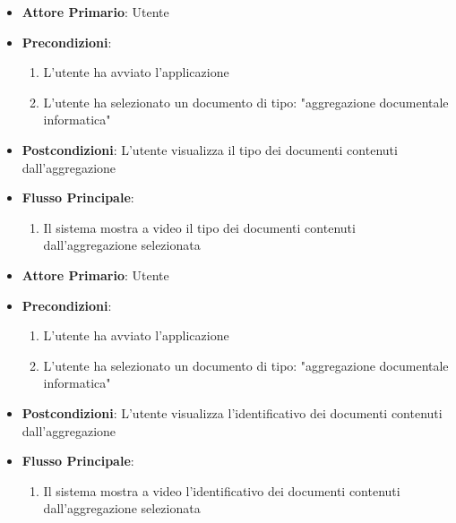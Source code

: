 \begin{itemize}
    \item \textbf{Attore Primario}: Utente
    \item \textbf{Precondizioni}:
    \begin{enumerate}
        \item L'utente ha avviato l'applicazione
        \item L'utente ha selezionato un documento di tipo: "aggregazione documentale informatica"
    \end{enumerate}
    \item \textbf{Postcondizioni}: L'utente visualizza il tipo dei documenti contenuti dall'aggregazione
    \item \textbf{Flusso Principale}: 
    \begin{enumerate} 
        \item Il sistema mostra a video il tipo dei documenti contenuti dall'aggregazione selezionata
    \end{enumerate}
\end{itemize}

\begin{itemize}
    \item \textbf{Attore Primario}: Utente
    \item \textbf{Precondizioni}:
    \begin{enumerate}
        \item L'utente ha avviato l'applicazione
        \item L'utente ha selezionato un documento di tipo: "aggregazione documentale informatica"
    \end{enumerate}
    \item \textbf{Postcondizioni}: L'utente visualizza l'identificativo dei documenti contenuti dall'aggregazione
    \item \textbf{Flusso Principale}: 
    \begin{enumerate} 
        \item Il sistema mostra a video l'identificativo dei documenti contenuti dall'aggregazione selezionata
    \end{enumerate}
\end{itemize}

